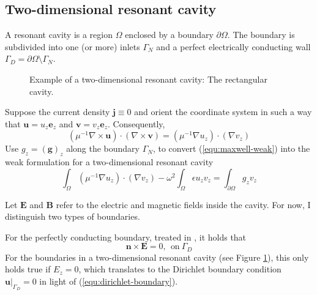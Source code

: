 \documentclass[11pt, a4paper]{article}
\begin{document}
\subsection{Two-dimensional resonant cavity}
\label{subsec:cavity}

A resonant cavity is a region $\Omega$ enclosed by a boundary $\partial \Omega$.
The boundary is subdivided into one (or more) inlets $\Gamma_N$ and a perfect
electrically conducting wall $\Gamma_D = \partial \Omega \setminus \Gamma_N$.

\begin{figure}[h]
    \centering
    
    \caption{Example of a two-dimensional resonant cavity: The rectangular
    cavity.}
    \label{fig:2d-waveguide}
\end{figure}

Suppose the current density $\mathbf{j} \equiv 0$ and orient the coordinate
system in such a way that $\mathbf{u} = u_z \mathbf{e}_z$ and 
$\mathbf{v} = v_z \mathbf{e}_z$. Consequently,
\begin{equation}
    (\mu^{-1} \nabla \times \mathbf{u}) \cdot (\nabla \times \mathbf{v})
    = (\mu^{-1} \nabla u_z) \cdot (\nabla v_z)
\end{equation}
Use $g_z = (\mathbf{g})_z$ along the boundary $\Gamma_N$,
to convert (\ref{equ:maxwell-weak}) into
the weak formulation for a two-dimensional resonant cavity
\begin{equation}
    \int_{\Omega} (\mu^{-1} \nabla u_z) \cdot (\nabla v_z)
    - \omega^2 \int_{\Omega} \epsilon u_z v_z
    = \int_{\partial \Omega} g_z v_z \label{equ:maxwell-weak-resonant-cavity}
\end{equation}

Let $\mathbf{E}$ and $\mathbf{B}$ refer to the electric and magnetic fields inside
the cavity. For now, I distinguish two types of boundaries.

For the perfectly conducting boundary, treated in \cite{monk}, it holds that
\begin{equation}
    \mathbf{n} \times \mathbf{E} = 0,~~\text{on}~\Gamma_D
\end{equation}
For the boundaries in a two-dimensional resonant cavity (see Figure 
\ref{fig:2d-waveguide}), this only holds true if $E_z = 0$, which translates
to the Dirichlet boundary condition $\left.\mathbf{u}\right|_{\Gamma_D} = 0$
in light of (\ref{equ:dirichlet-boundary}).
\end{document}
